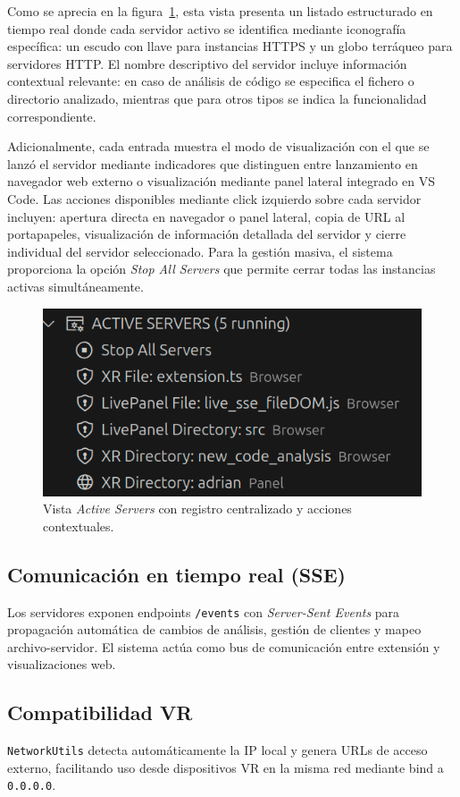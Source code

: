 \documentclass[a4paper, 12pt]{book}
\begin{document}
Como se aprecia en la figura~\ref{fig:ui-active-servers}, esta vista presenta un listado estructurado en tiempo real donde cada servidor activo se identifica mediante iconografía específica: un escudo con llave para instancias HTTPS y un globo terráqueo para servidores HTTP. El nombre descriptivo del servidor incluye información contextual relevante: en caso de análisis de código se especifica el fichero o directorio analizado, mientras que para otros tipos se indica la funcionalidad correspondiente.

Adicionalmente, cada entrada muestra el modo de visualización con el que se lanzó el servidor mediante indicadores que distinguen entre lanzamiento en navegador web externo o visualización mediante panel lateral integrado en VS Code. Las acciones disponibles mediante click izquierdo sobre cada servidor incluyen: apertura directa en navegador o panel lateral, copia de URL al portapapeles, visualización de información detallada del servidor y cierre individual del servidor seleccionado. Para la gestión masiva, el sistema proporciona la opción \emph{Stop All Servers} que permite cerrar todas las instancias activas simultáneamente.

\begin{figure}[H]
\centering
\includegraphics[width=0.65\linewidth]{img/ui-active-servers.png}
\caption{Vista \emph{Active Servers} con registro centralizado y acciones contextuales.}
\label{fig:ui-active-servers}
\end{figure}

\subsection{Comunicación en tiempo real (SSE)}
Los servidores exponen endpoints \texttt{/events} con \emph{Server-Sent Events} para propagación automática de cambios de análisis, gestión de clientes y mapeo archivo-servidor. El sistema actúa como bus de comunicación entre extensión y visualizaciones web.

\subsection{Compatibilidad VR}
\texttt{NetworkUtils} detecta automáticamente la IP local y genera URLs de acceso externo, facilitando uso desde dispositivos VR en la misma red mediante bind a \texttt{0.0.0.0}.
\end{document}

